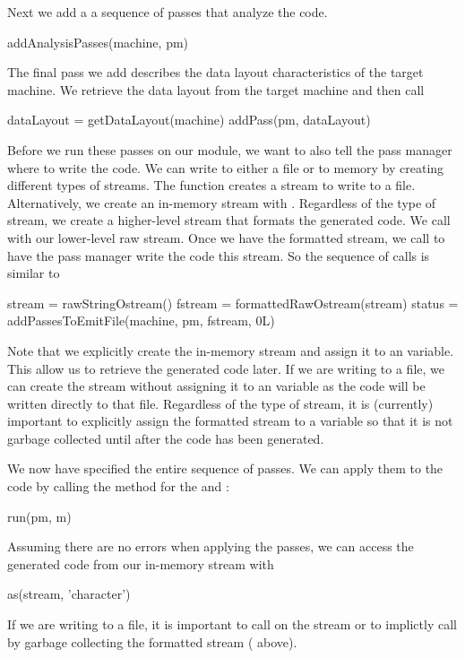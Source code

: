 Next we add a a sequence of passes that analyze the code.
\begin{RCode}
addAnalysisPasses(machine, pm)
\end{RCode}

The final pass we add describes the
data layout characteristics of the target machine.
We retrieve the data layout from the target machine and
then call 
\begin{RCode}
dataLayout = getDataLayout(machine)
addPass(pm, dataLayout)
\end{RCode}


Before we run these passes on our module, we want to also tell the
pass manager where to write the code.  We can write to either a file
or to memory by creating different types of streams.  The function
 creates a stream to write to a file.
Alternatively, we create an in-memory stream with
. 
Regardless of the type of stream, we create a higher-level
stream that formats the generated code. 
We call  with our lower-level raw stream.
Once we have the formatted stream, we call
 to have the pass manager write the code
this stream.
So the sequence of calls is similar to 
\begin{RCode}
stream = rawStringOstream()
fstream = formattedRawOstream(stream)
status = addPassesToEmitFile(machine, pm, fstream, 0L)
\end{RCode}
Note that we explicitly create the in-memory stream and assign it to
an \R{} variable. This allow us to retrieve the generated code later.
If we are writing to a file, we can create the stream without
assigning it to an \R{} variable as the code will be written directly
to that file.
Regardless of the type of stream, it is (currently) important to explicitly
assign the formatted stream to a variable so that it is not garbage
collected until after the code has been generated.

We now have specified the entire sequence of passes.  We can apply
them to the code by calling the  method for the
 and :
\begin{RCode}
run(pm, m)
\end{RCode}

Assuming there are no errors when applying the passes, 
we can access the generated code from our in-memory stream
with 
\begin{RCode}
as(stream, 'character')
\end{RCode}
If we are writing to a file, it is important to call
 on the stream or to implictly call 
by garbage collecting the formatted stream ( above).



